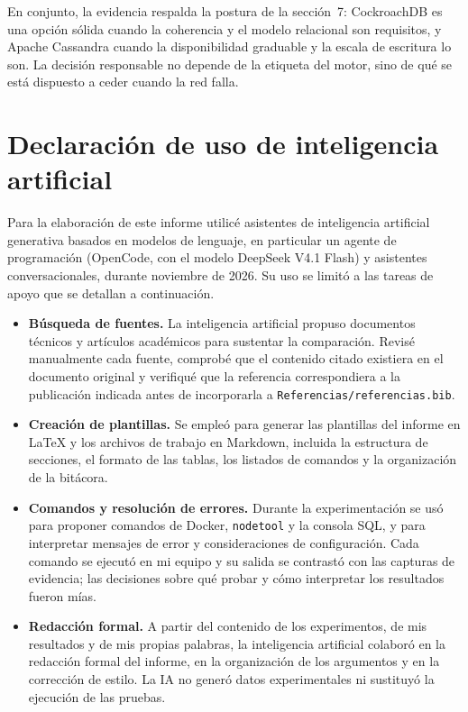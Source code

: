 \documentclass[11pt,a4paper]{article}
\newcommand{\sistemaA}{CockroachDB}      %
\newcommand{\sistemaB}{Apache Cassandra} %
\begin{document}
En conjunto, la evidencia respalda la postura de la sección~7: \sistemaA{} es una
opción sólida cuando la coherencia y el modelo relacional son requisitos, y
\sistemaB{} cuando la disponibilidad graduable y la escala de escritura lo son. La
decisión responsable no depende de la etiqueta del motor, sino de qué se está
dispuesto a ceder cuando la red falla.

\clearpage
\section*{Declaración de uso de inteligencia artificial}
Para la elaboración de este informe utilicé asistentes de inteligencia artificial
generativa basados en modelos de lenguaje, en particular un agente de programación
(OpenCode, con el modelo DeepSeek V4.1 Flash) y asistentes conversacionales, durante
noviembre de 2026. Su uso se limitó a las tareas de apoyo que se detallan a
continuación.

\begin{itemize}
  \item \textbf{Búsqueda de fuentes.} La inteligencia artificial propuso documentos
  técnicos y artículos académicos para sustentar la comparación. Revisé manualmente
  cada fuente, comprobé que el contenido citado existiera en el documento original y
  verifiqué que la referencia correspondiera a la publicación indicada antes de
  incorporarla a \texttt{Referencias/referencias.bib}.
  \item \textbf{Creación de plantillas.} Se empleó para generar las plantillas del
  informe en LaTeX y los archivos de trabajo en Markdown, incluida la estructura de
  secciones, el formato de las tablas, los listados de comandos y la organización de
  la bitácora.
  \item \textbf{Comandos y resolución de errores.} Durante la experimentación se usó
  para proponer comandos de Docker, \texttt{nodetool} y la consola SQL, y para
  interpretar mensajes de error y consideraciones de configuración. Cada comando se
  ejecutó en mi equipo y su salida se contrastó con las capturas de evidencia; las
  decisiones sobre qué probar y cómo interpretar los resultados fueron mías.
  \item \textbf{Redacción formal.} A partir del contenido de los experimentos, de mis
  resultados y de mis propias palabras, la inteligencia artificial colaboró en la
  redacción formal del informe, en la organización de los argumentos y en la
  corrección de estilo. La IA no generó datos experimentales ni sustituyó la
  ejecución de las pruebas.
\end{itemize}
\end{document}

